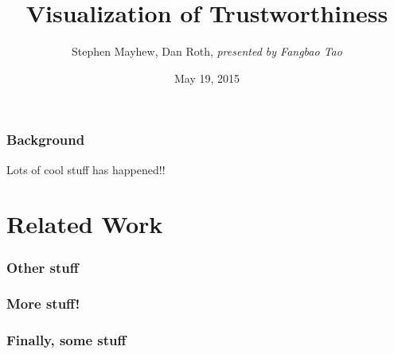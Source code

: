 \documentclass[10pt, compress]{beamer}
\title{Visualization of Trustworthiness}
\subtitle{}
\date{May 19, 2015}
\author{Stephen Mayhew, Dan Roth, \textit{presented by Fangbao Tao}}
\institute{University of Illinois at Urbana Champaign}
\begin{document}
\maketitle

\begin{frame}[fragile]
  \frametitle{Background}

Lots of cool stuff has happened!!

\end{frame}


\section{Related Work}

\begin{frame}[fragile]
  \frametitle{Other stuff}

\end{frame}

\begin{frame}[fragile]
  \frametitle{More stuff!}

\end{frame}

\begin{frame}[fragile]
  \frametitle{Finally, some stuff}

\end{frame}

\end{document}
